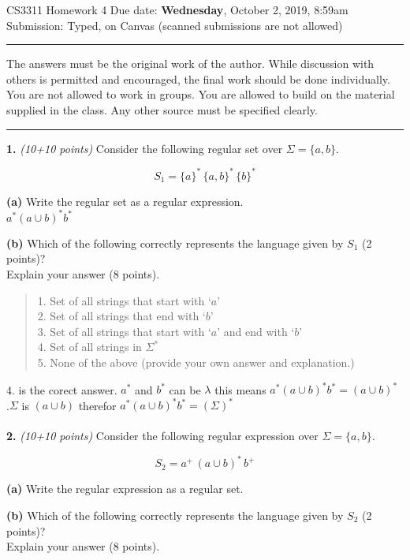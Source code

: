 \documentclass[12pt]{article}
\begin{document}
\thispagestyle{empty}

{\large CS3311 Homework 4} \hfill
Due date: {\bf Wednesday}, October 2, 2019, 8:59am\\
\hfill
Submission: Typed, on Canvas (scanned submissions are not allowed)
\vspace{-0.1in}

\rule{\textwidth}{0.5mm}
\begin{small}
The answers must be the original work of the author.  While discussion
with others is permitted and encouraged, the final work should be done
individually. You are not allowed to work in groups.  You are allowed to
build on the material supplied in the class. Any other source must be
specified clearly.
\end{small}
\rule{\textwidth}{0.5mm}

{\bf 1.} {\em (10+10 points)}
Consider the following regular set over $\Sigma=\{a,b\}$.

\[
S_1 = \{a\}^* \, \{a,b\}^* \, \{b\}^*
\]

{\bf (a)} Write the regular set as a regular expression.\\
$a^* (a\cup b)^* b^*$

{\bf (b)} Which of the following correctly represents the language given by
$S_1$ (2 points)?
\\
Explain your answer (8 points).

\begin{quote}
1. Set of all strings that start with `$a$'
\\
2. Set of all strings that end with `$b$'
\\
3. Set of all strings that start with `$a$' and end with `$b$'
\\
4. Set of all strings in $\Sigma^*$
\\
5. None of the above (provide your own answer and explanation.)
\end{quote}

4. is the corect answer. $a^*$ and $b^*$ can be $\lambda$  this means $a^* (a\cup b)^* b^* =(a\cup b)^*$ .$\Sigma$ is $(a\cup b)$ therefor $a^* (a\cup b)^* b^* =(\Sigma)^*$   \\\\
{\bf 2.} {\em (10+10 points)}
Consider the following regular expression over $\Sigma=\{a,b\}$.

\[
S_2 = a^+ \, (a \cup b )^*  \, b^+
\]

{\bf (a)} Write the regular expression as a regular set.

{\bf (b)} Which of the following correctly represents the language given by
$S_2$ (2 points)?
\\
Explain your answer (8 points).
\end{document}
